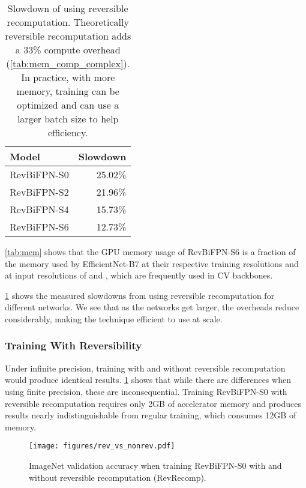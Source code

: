 \documentclass{article}
\begin{document}
\begin{table}
    \caption{
        Slowdown of using reversible recomputation. Theoretically reversible recomputation adds a 33\% compute overhead (\cref{tab:mem_comp_complex}). In practice, with more memory, training can be optimized and can use a larger batch size to help efficiency.
    }
    \vskip 10pt
    \centering
    \small
    \sc
    \begin{tabular}{lr}
        \toprule
        Model       & Slowdown \\ \midrule
        RevBiFPN-S0 &  25.02\% \\
        RevBiFPN-S2 &  21.96\% \\
        RevBiFPN-S4 &  15.73\% \\
        RevBiFPN-S6 &  12.73\% \\
        \bottomrule
    \end{tabular}
    \label{tab:revrecomp_slowdowns}
    \vskip -7pt
\end{table}

\cref{tab:mem} shows that the GPU memory usage of RevBiFPN-S6 is a fraction of the memory used by EfficientNet-B7 at their respective training resolutions
and at input resolutions of  and , which are frequently used in CV backbones.

\cref{tab:revrecomp_slowdowns} shows the measured slowdowns from using reversible recomputation for different networks. We see that as the networks get larger, the overheads reduce considerably, making the technique efficient to use at scale.



\subsubsection{Training With Reversibility}
\label{sec:i1k_rev_training}

Under infinite precision, training with and without reversible recomputation would produce identical results.
\cref{fig:i1k_rev_training} shows that while there are differences when using finite precision, these are inconsequential.
Training RevBiFPN-S0 with reversible recomputation requires only 2GB of accelerator memory and produces results nearly indistinguishable from regular training, which consumes 12GB of memory.

\begin{figure}
    \centering
    \texttt{[image: figures/rev\_vs\_nonrev.pdf]}
    \vskip -10pt
    \caption{ImageNet validation accuracy when training RevBiFPN-S0 with and without reversible recomputation (RevRecomp).}
    \label{fig:i1k_rev_training}
    \vskip -10pt
\end{figure}
\end{document}
